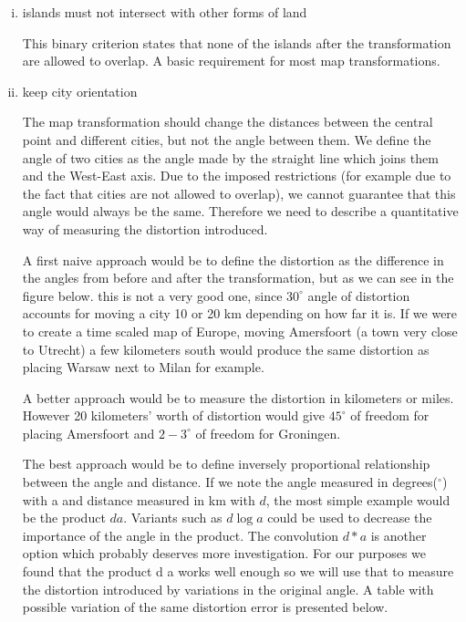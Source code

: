 \documentclass[a4paper,11pt]{article}
\begin{document}
\begin{enumerate}[(i)]
    \item islands must not intersect with other forms of land

      This binary criterion states that none of the islands after the
      transformation are allowed to overlap. A basic requirement for
      most map transformations.
    
    \item keep city orientation
      
      The map transformation should change the distances between the
      central point and different cities, but not the angle between
      them. We define the angle of two cities as the angle made by the
      straight line which joins them and the West-East axis. Due to
      the imposed restrictions (for example due to the fact that
      cities are not allowed to overlap), we cannot guarantee that
      this angle would always be the same. Therefore we need to
      describe a quantitative way of measuring the distortion
      introduced.

      A first naive approach would be to define the distortion as the
      difference in the angles from before and after the
      transformation, but as we can see in the figure below. this is
      not a very good one, since $30^{\circ}$ angle of distortion
      accounts for moving a city 10 or 20 km depending on how far it
      is. If we were to create a time scaled map of Europe, moving
      Amersfoort (a town very close to Utrecht) a few kilometers south
      would produce the same distortion as placing Warsaw next to
      Milan for example.

      A better approach would be to measure the distortion in
      kilometers or miles. However 20 kilometers' worth of distortion
      would give $45^{\circ}$ of freedom for placing Amersfoort and $2-3^{\circ}$ of
      freedom for Groningen.

      The best approach would be to define inversely proportional
      relationship between the angle and distance. If we note the
      angle measured in degrees($^{\circ}$) with a and distance
      measured in km with $d$, the most simple example would be the
      product $da$. Variants such as $d\log{a}$ could be used to
      decrease the importance of the angle in the product. The
      convolution $d*a$ is another option which probably deserves more
      investigation. For our purposes we found that the product d a
      works well enough so we will use that to measure the distortion
      introduced by variations in the original angle. A table with
      possible variation of the same distortion error is presented
      below.


\end{enumerate}
\end{document}
